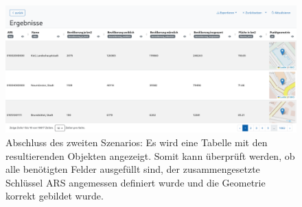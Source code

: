 \begin{figure}
  \centering
  \includegraphics[width=.95\textwidth]{assets/results-szenario-2.png}
  \caption[Ergebnisstabelle am Ende des zweiten Szenarios]{Abschluss des zweiten Szenarios: Es wird eine Tabelle mit den resultierenden Objekten angezeigt. Somit kann überprüft werden, ob alle benötigten Felder ausgefüllt sind, der zusammengesetzte Schlüssel \ac{ARS} angemessen definiert wurde und die Geometrie korrekt gebildet wurde.}
  \label{fig:scenario-result}
\end{figure}

